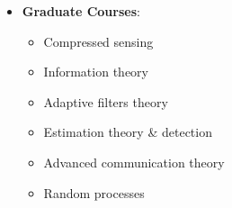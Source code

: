 
\begin{itemize}
	\item \textbf{Graduate Courses}:
	      \begin{itemize}
		      \item Compressed sensing
		      \item Information theory
		      \item Adaptive filters theory
		      \item Estimation theory \& detection
		      \item Advanced communication theory
		      \item Random processes
	      \end{itemize}
\end{itemize}
